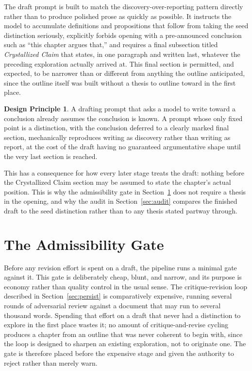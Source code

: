 \documentclass[11pt]{article}
\theoremstyle{definition}
\newtheorem{principle}{Design Principle}
\begin{document}
The draft prompt is built to match the discovery-over-reporting pattern
directly rather than to produce polished prose as quickly as possible.
It instructs the model to accumulate definitions and propositions that
follow from taking the seed distinction seriously, explicitly forbids
opening with a pre-announced conclusion such as ``this chapter argues
that,'' and requires a final subsection titled \emph{Crystallized
Claim} that states, in one paragraph and written last, whatever the
preceding exploration actually arrived at. This final section is
permitted, and expected, to be narrower than or different from anything
the outline anticipated, since the outline itself was built without a
thesis to outline toward in the first place.

\begin{principle}
A drafting prompt that asks a model to write toward a conclusion
already assumes the conclusion is known. A prompt whose only fixed
point is a distinction, with the conclusion deferred to a clearly
marked final section, mechanically reproduces writing as discovery
rather than writing as report, at the cost of the draft having no
guaranteed argumentative shape until the very last section is reached.
\end{principle}

This has a consequence for how every later stage treats the draft:
nothing before the Crystallized Claim section may be assumed to state
the chapter's actual position. This is why the admissibility gate in
Section~\ref{sec:gate} does not require a thesis in the opening, and
why the audit in Section~\ref{sec:audit} compares the finished draft to
the seed distinction rather than to any thesis stated partway through.

\section{The Admissibility Gate}
\label{sec:gate}

Before any revision effort is spent on a draft, the pipeline runs a
minimal gate against it. This gate is deliberately cheap, blunt, and
narrow, and its purpose is economy rather than quality control in the
usual sense. The critique-revision loop described in
Section~\ref{sec:persist} is comparatively expensive, running several
rounds of adversarial review against a document that may run to several
thousand words. Spending that effort on a draft that never had a
distinction to explore in the first place wastes it; no amount of
critique-and-revise cycling produces a chapter from an outline that was
never coherent to begin with, since the loop is designed to sharpen an
existing exploration, not to originate one. The gate is therefore
placed before the expensive stage and given the authority to reject
rather than merely warn.
\end{document}
